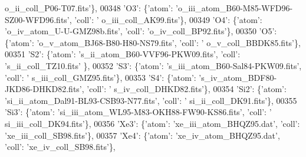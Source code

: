 \begin{DoxyCode}
{      o\_ii\_coll\_P06-T07.fits'}\},
00348                              \textcolor{stringliteral}{'O3'}: \{\textcolor{stringliteral}{'atom'}: \textcolor{stringliteral}{'o\_iii\_atom\_B60-M85-WFD96-SZ00-WFD96.fits'}, \textcolor{stringliteral}{'coll'}: \textcolor{stringliteral}{'
      o\_iii\_coll\_AK99.fits'}\},
00349                              \textcolor{stringliteral}{'O4'}: \{\textcolor{stringliteral}{'atom'}: \textcolor{stringliteral}{'o\_iv\_atom\_U-U-GMZ98b.fits'}, \textcolor{stringliteral}{'coll'}: \textcolor{stringliteral}{'o\_iv\_coll\_BP92.fits'}\},
00350                              \textcolor{stringliteral}{'O5'}: \{\textcolor{stringliteral}{'atom'}: \textcolor{stringliteral}{'o\_v\_atom\_BJ68-B80-H80-NS79.fits'}, \textcolor{stringliteral}{'coll'}: \textcolor{stringliteral}{'
      o\_v\_coll\_BBDK85.fits'}\},
00351                              \textcolor{stringliteral}{'S2'}: \{\textcolor{stringliteral}{'atom'}: \textcolor{stringliteral}{'s\_ii\_atom\_B60-VVF96-PKW09.fits'}, \textcolor{stringliteral}{'coll'}: \textcolor{stringliteral}{'s\_ii\_coll\_TZ10.fits'}
      \},
00352                              \textcolor{stringliteral}{'S3'}: \{\textcolor{stringliteral}{'atom'}: \textcolor{stringliteral}{'s\_iii\_atom\_B60-Sal84-PKW09.fits'}, \textcolor{stringliteral}{'coll'}: \textcolor{stringliteral}{'
      s\_iii\_coll\_GMZ95.fits'}\},
00353                              \textcolor{stringliteral}{'S4'}: \{\textcolor{stringliteral}{'atom'}: \textcolor{stringliteral}{'s\_iv\_atom\_BDF80-JKD86-DHKD82.fits'}, \textcolor{stringliteral}{'coll'}: \textcolor{stringliteral}{'
      s\_iv\_coll\_DHKD82.fits'}\},
00354                              \textcolor{stringliteral}{'Si2'}: \{\textcolor{stringliteral}{'atom'}: \textcolor{stringliteral}{'si\_ii\_atom\_Dal91-BL93-CSB93-N77.fits'}, \textcolor{stringliteral}{'coll'}: \textcolor{stringliteral}{'
      si\_ii\_coll\_DK91.fits'}\},
00355                              \textcolor{stringliteral}{'Si3'}: \{\textcolor{stringliteral}{'atom'}: \textcolor{stringliteral}{'si\_iii\_atom\_WL95-M83-OKH88-FW90-KS86.fits'}, \textcolor{stringliteral}{'coll'}: \textcolor{stringliteral}{'
      si\_iii\_coll\_DK94.fits'}\},
00356                              \textcolor{stringliteral}{'Xe3'}: \{\textcolor{stringliteral}{'atom'}: \textcolor{stringliteral}{'xe\_iii\_atom\_BHQZ95.dat'}, \textcolor{stringliteral}{'coll'}: \textcolor{stringliteral}{'xe\_iii\_coll\_SB98.fits'}\},
00357                              \textcolor{stringliteral}{'Xe4'}: \{\textcolor{stringliteral}{'atom'}: \textcolor{stringliteral}{'xe\_iv\_atom\_BHQZ95.dat'}, \textcolor{stringliteral}{'coll'}: \textcolor{stringliteral}{'xe\_iv\_coll\_SB98.fits'}\},

\end{DoxyCode}
